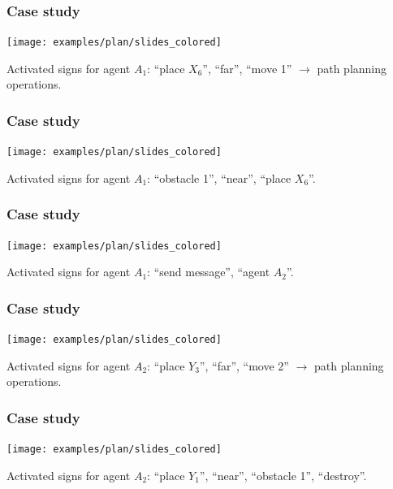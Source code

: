 \documentclass[default]{beamer}
\begin{document}
	\begin{frame}
		\frametitle{Case study}
		
		\begin{center}
			\texttt{[image: examples/plan/slides\_colored]}
		\end{center}
		\par\bigskip
		Activated signs for agent $A_1$: ``place $X_6$'', ``far'', ``move 1'' $\rightarrow$ \color{red} path planning operations.
	\end{frame}
	
	\begin{frame}
		\frametitle{Case study}
		
		\begin{center}
			\texttt{[image: examples/plan/slides\_colored]}
		\end{center}
		\par\bigskip
		Activated signs for agent $A_1$: ``obstacle 1'', ``near'', ``place $X_6$''.
	\end{frame}
	
	\begin{frame}
		\frametitle{Case study}
		
		\begin{center}
			\texttt{[image: examples/plan/slides\_colored]}
		\end{center}
		\par\bigskip
		Activated signs for agent $A_1$: ``send message'', ``agent $A_2$''.
	\end{frame}
	
	\begin{frame}
		\frametitle{Case study}
		
		\begin{center}
			\texttt{[image: examples/plan/slides\_colored]}
		\end{center}
		\par\bigskip
		Activated signs for agent $A_2$: ``place $Y_3$'', ``far'', ``move 2'' $\rightarrow$ \color{red} path planning operations.
	\end{frame}
	
	\begin{frame}
		\frametitle{Case study}
		
		\begin{center}
			\texttt{[image: examples/plan/slides\_colored]}
		\end{center}
		\par\bigskip
		Activated signs for agent $A_2$: ``place $Y_1$'', ``near'', ``obstacle 1'', ``destroy''.
	\end{frame}
	
\end{document}
